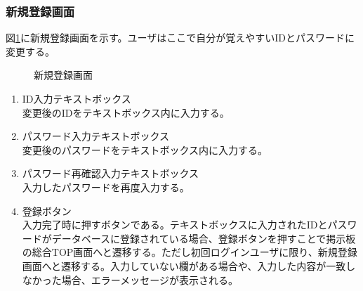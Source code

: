 \documentclass[a4j]{jarticle}
\begin{document}
\subsubsection{新規登録画面}
図\ref{fig:subscribe_user}に新規登録画面を示す。ユーザはここで自分が覚えやすいIDとパスワードに変更する。
\begin{figure}[H]
\centering
{}
\caption{新規登録画面}
\label{fig:subscribe_user}
\end{figure}
\begin{enumerate}
  \renewcommand{\labelenumi}{\textcircled{\scriptsize \theenumi}}

\item ID入力テキストボックス\\
変更後のIDをテキストボックス内に入力する。
\item パスワード入力テキストボックス\\
変更後のパスワードをテキストボックス内に入力する。
\item パスワード再確認入力テキストボックス\\
入力したパスワードを再度入力する。
\item 登録ボタン\\
入力完了時に押すボタンである。テキストボックスに入力されたIDとパスワードがデータベースに登録されている場合、登録ボタンを押すことで掲示板の総合TOP画面へと遷移する。ただし初回ログインユーザに限り、新規登録画面へと遷移する。入力していない欄がある場合や、入力した内容が一致しなかった場合、エラーメッセージが表示される。

\end{enumerate}
\end{document}
